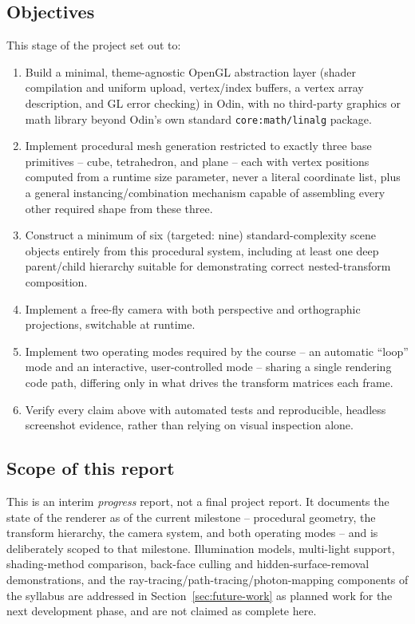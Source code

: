 \documentclass[11pt,a4paper]{article}
\begin{document}
\subsection{Objectives}
This stage of the project set out to:
\begin{enumerate}[nosep]
  \item Build a minimal, theme-agnostic OpenGL abstraction layer (shader
        compilation and uniform upload, vertex/index buffers, a vertex
        array description, and GL error checking) in Odin, with no
        third-party graphics or math library beyond Odin's own standard
        \texttt{core:math/linalg} package.
  \item Implement procedural mesh generation restricted to exactly three
        base primitives -- cube, tetrahedron, and plane -- each with
        vertex positions computed from a runtime size parameter, never a
        literal coordinate list, plus a general instancing/combination
        mechanism capable of assembling every other required shape from
        these three.
  \item Construct a minimum of six (targeted: nine) standard-complexity
        scene objects entirely from this procedural system, including at
        least one deep parent/child hierarchy suitable for demonstrating
        correct nested-transform composition.
  \item Implement a free-fly camera with both perspective and
        orthographic projections, switchable at runtime.
  \item Implement two operating modes required by the course -- an
        automatic ``loop'' mode and an interactive, user-controlled mode
        -- sharing a single rendering code path, differing only in what
        drives the transform matrices each frame.
  \item Verify every claim above with automated tests and reproducible,
        headless screenshot evidence, rather than relying on visual
        inspection alone.
\end{enumerate}

\subsection{Scope of this report}
This is an interim \emph{progress} report, not a final project report.
It documents the state of the renderer as of the current milestone --
procedural geometry, the transform hierarchy, the camera system, and
both operating modes -- and is deliberately scoped to that milestone.
Illumination models, multi-light support, shading-method comparison,
back-face culling and hidden-surface-removal demonstrations, and the
ray-tracing/path-tracing/photon-mapping components of the syllabus are
addressed in Section~\ref{sec:future-work} as planned work for the next
development phase, and are not claimed as complete here.
\end{document}
